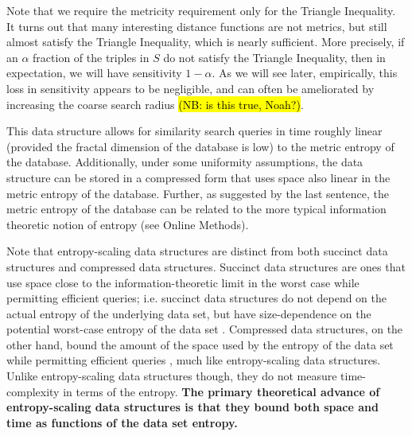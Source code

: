\documentclass[review,preprint,12pt]{elsarticle}
\renewcommand{\cite}{\citep} %
\theoremstyle{definition}
\theoremstyle{remark}
\numberwithin{equation}{section}
\begin{document}
Note that we require the metricity requirement only for the Triangle Inequality.
It turns out that many interesting distance functions are not metrics, but still almost satisfy the Triangle Inequality, which is nearly sufficient.
More precisely, if an $\alpha$ fraction of the triples in $S$ do not satisfy the Triangle Inequality, then in expectation, we will have sensitivity $1 - \alpha$.
As we will see later, empirically, this loss in sensitivity appears to be negligible, and can often be ameliorated by increasing the coarse search radius \hl{(NB: is this true, Noah?)}.

This data structure allows for similarity search queries in time roughly linear (provided the fractal dimension of the database is low) to the metric entropy of the database.
Additionally, under some uniformity assumptions, the data structure can be stored in a compressed form that uses space also linear in the metric entropy of the database.
Further, as suggested by the last sentence, the metric entropy of the database can be related to the more typical information theoretic notion of entropy (see Online Methods).

Note that entropy-scaling data structures are distinct from both succinct data structures and compressed data structures.
Succinct data structures are ones that use space close to the information-theoretic limit in the worst case while permitting efficient queries; i.e.
succinct data structures do not depend on the actual entropy of the underlying data set, but have size-dependence on the potential worst-case entropy of the data set \cite{jacobson1988succinct}.
Compressed data structures, on the other hand, bound the amount of the space used by the entropy of the data set while permitting efficient queries \cite{grossi2005compressed, ferragina2000opportunistic}, much like entropy-scaling data structures.
Unlike entropy-scaling data structures though, they do not measure time-complexity in terms of the entropy.
\textbf{The primary theoretical advance of entropy-scaling data structures is that they bound both space and time as functions of the data set entropy.}
\end{document}
